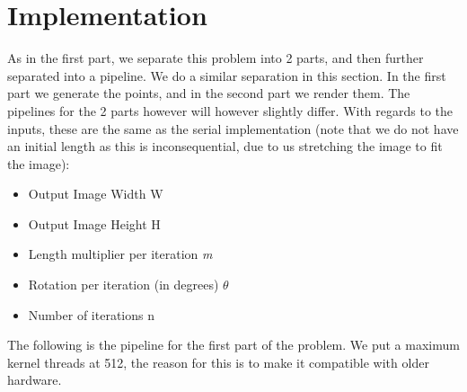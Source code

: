 \section{Implementation}
As in the first part, we separate this problem into 2 parts, and then further separated into a pipeline. We do a similar separation in this section. In the first part we generate the points, and in the second part we render them. The pipelines for the 2 parts however will however slightly differ. With regards to the inputs, these are the same as the serial implementation (note that we do not have an initial length as this is inconsequential, due to us stretching the image to fit the image):

\begin{itemize}
	\item Output Image Width W
	\item Output Image Height H
	\item Length multiplier per iteration \textit{m}
	\item Rotation per iteration (in degrees) $\theta$
	\item Number of iterations n
\end{itemize}

The following is the pipeline for the first part of the problem. We put a maximum kernel threads at 512, the reason for this is to make it compatible with older hardware.


